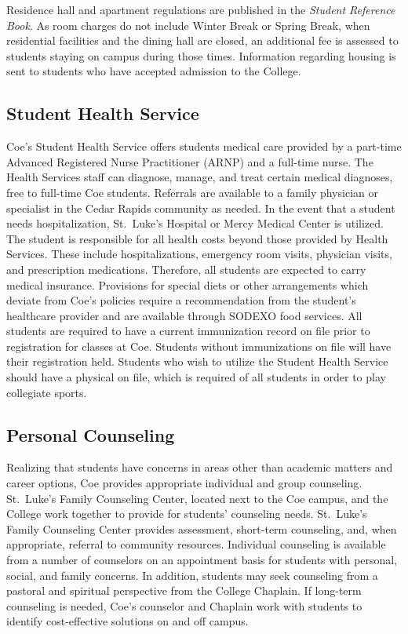 \documentclass[
  letterpaper,
]{scrbook}
\begin{document}
Residence hall and apartment regulations are published in the
\emph{Student Reference Book}. As room charges do not include Winter
Break or Spring Break, when residential facilities and the dining hall
are closed, an additional fee is assessed to students staying on campus
during those times. Information regarding housing is sent to students
who have accepted admission to the College.

\subsection{Student Health Service}\label{student-health-service}

Coe's Student Health Service offers students medical care provided by a
part-time Advanced Registered Nurse Practitioner (ARNP) and a full-time
nurse. The Health Services staff can diagnose, manage, and treat certain
medical diagnoses, free to full-time Coe students. Referrals are
available to a family physician or specialist in the Cedar Rapids
community as needed. In the event that a student needs hospitalization,
St.~Luke's Hospital or Mercy Medical Center is utilized. The student is
responsible for all health costs beyond those provided by Health
Services. These include hospitalizations, emergency room visits,
physician visits, and prescription medications. Therefore, all students
are expected to carry medical insurance. Provisions for special diets or
other arrangements which deviate from Coe's policies require a
recommendation from the student's healthcare provider and are available
through SODEXO food services. All students are required to have a
current immunization record on file prior to registration for classes at
Coe. Students without immunizations on file will have their registration
held. Students who wish to utilize the Student Health Service should
have a physical on file, which is required of all students in order to
play collegiate sports.

\subsection{Personal Counseling}\label{personal-counseling}

Realizing that students have concerns in areas other than academic
matters and career options, Coe provides appropriate individual and
group counseling. St.~Luke's Family Counseling Center, located next to
the Coe campus, and the College work together to provide for students'
counseling needs. St.~Luke's Family Counseling Center provides
assessment, short-term counseling, and, when appropriate, referral to
community resources. Individual counseling is available from a number of
counselors on an appointment basis for students with personal, social,
and family concerns. In addition, students may seek counseling from a
pastoral and spiritual perspective from the College Chaplain. If
long-term counseling is needed, Coe's counselor and Chaplain work with
students to identify cost-effective solutions on and off campus.
\end{document}
